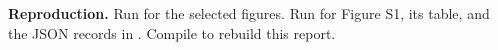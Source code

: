\documentclass[10pt,letterpaper]{article}
\begin{document}
\begingroup\raggedright\textbf{Reproduction.} Run  for the selected figures.
Run  for Figure S1, its table, and the
JSON records in . Compile
 to rebuild this report.\par\endgroup
\end{document}
